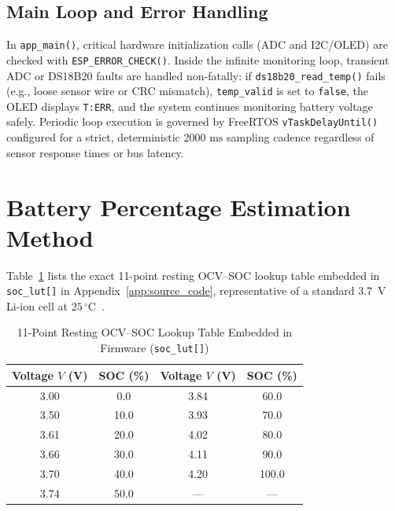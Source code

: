 \documentclass[12pt,a4paper]{article}
\begin{document}
\subsection{Main Loop and Error Handling}
In \texttt{app\_main()}, critical hardware initialization calls (ADC and I2C/OLED) are checked with \texttt{ESP\_ERROR\_CHECK()}. Inside the infinite monitoring loop, transient ADC or DS18B20 faults are handled non-fatally: if \texttt{ds18b20\_read\_temp()} fails (e.g., loose sensor wire or CRC mismatch), \texttt{temp\_valid} is set to \texttt{false}, the OLED displays \texttt{T:ERR}, and the system continues monitoring battery voltage safely. Periodic loop execution is governed by FreeRTOS \texttt{vTaskDelayUntil()} configured for a strict, deterministic $2000\text{ ms}$ sampling cadence regardless of sensor response times or bus latency.

\section{Battery Percentage Estimation Method}
\label{sec:soc_estimation}

Table~\ref{tab:soc_lut} lists the exact 11-point resting OCV--SOC lookup table embedded in \texttt{soc\_lut[]} in Appendix~\ref{app:source_code}, representative of a standard 3.7~V Li-ion cell at $25\,^\circ\text{C}$~\cite{reddy_linden}.

\begin{table}[H]
\centering


\renewcommand{\arraystretch}{1.15}
\begin{tabular}{|@{}c|c|c|c@{}|}
\hline
\textbf{Voltage $V$ (V)} & \textbf{SOC (\%)} & \textbf{Voltage $V$ (V)} & \textbf{SOC (\%)} \\
\hline
3.00 & 0.0  & 3.84 & 60.0 \\\hline
3.50 & 10.0 & 3.93 & 70.0 \\\hline
3.61 & 20.0 & 4.02 & 80.0 \\\hline
3.66 & 30.0 & 4.11 & 90.0 \\\hline
3.70 & 40.0 & 4.20 & 100.0 \\\hline
3.74 & 50.0 & ---  & ---  \\
\hline
\end{tabular}
\caption{11-Point Resting OCV--SOC Lookup Table Embedded in Firmware (\texttt{soc\_lut[]})}
\label{tab:soc_lut}
\end{table}
\end{document}

